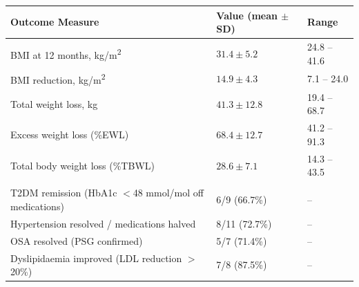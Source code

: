 \documentclass[11pt,a4paper]{article}
\begin{document}
\begin{center}
\small
\setlength{\tabcolsep}{7pt}
\renewcommand{\arraystretch}{1.35}
\begin{tabularx}{\textwidth}{L{5.8cm} C{4.0cm} C{4.0cm}}
  \color{white}\bfseries Outcome Measure &
  \color{white}\bfseries Value (mean $\pm$ SD) &
  \color{white}\bfseries Range \\
  \midrule
  BMI at 12 months, kg/m\textsuperscript{2} & $31.4 \pm 5.2$ & 24.8 -- 41.6 \\
  BMI reduction, kg/m\textsuperscript{2} & $14.9 \pm 4.3$ & 7.1 -- 24.0 \\
  Total weight loss, kg & $41.3 \pm 12.8$ & 19.4 -- 68.7 \\
  Excess weight loss (\%EWL) & $68.4 \pm 12.7$ & 41.2 -- 91.3 \\
  Total body weight loss (\%TBWL) & $28.6 \pm 7.1$ & 14.3 -- 43.5 \\
  \midrule
  \\
  T2DM remission (HbA1c $<$48 mmol/mol off medications) & 6/9 (66.7\%) & -- \\
  Hypertension resolved / medications halved & 8/11 (72.7\%) & -- \\
  OSA resolved (PSG confirmed) & 5/7 (71.4\%) & -- \\
  Dyslipidaemia improved (LDL reduction $>$20\%) & 7/8 (87.5\%) & -- \\
  \bottomrule
\end{tabularx}
\end{center}

\vspace{6pt}
\end{document}

